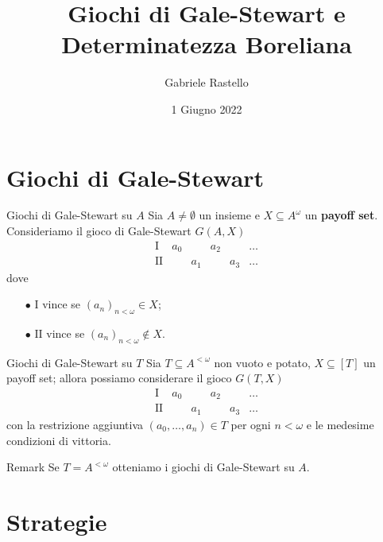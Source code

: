 \documentclass[aspectratio=43]{beamer}
\title{Giochi di Gale-Stewart e Determinatezza Boreliana}
\author{Gabriele Rastello}
\date{1 Giugno 2022}
\begin{document}
\begin{frame}
  \titlepage
\end{frame}

\section{Giochi di Gale-Stewart}

\begin{frame}{Giochi di Gale-Stewart su \(A\)}
  Sia \(A \neq \emptyset\) un insieme e \(X \subseteq A^\omega\) un \textbf{payoff set}.
  Consideriamo il gioco di Gale-Stewart \(G(A, X)\)
  \begin{equation*}
    \begin{matrix}
      \mathrm{I} & a_0 & & a_2 & & \ldots\\
      \mathrm{II} & & a_1 & & a_3 & \ldots
    \end{matrix}
  \end{equation*}
  \pause
  dove
  \begin{itemize}
  \item[\(\bullet\)] \(\mathrm{I}\) vince se \((a_n)_{n < \omega} \in X\);
  \item[\(\bullet\)] \(\mathrm{II}\) vince se \((a_n)_{n < \omega} \not\in X\).
  \end{itemize}
\end{frame}

\begin{frame}{Giochi di Gale-Stewart su \(T\)}
  Sia \(T \subseteq A^{<\omega}\) non vuoto e potato, \(X\subseteq [T]\) un payoff set; allora possiamo considerare il gioco \(G(T, X)\)
  \begin{equation*}
    \begin{matrix}
      \mathrm{I} & a_0 & & a_2 & & \ldots\\
      \mathrm{II} & & a_1 & & a_3 & \ldots
    \end{matrix}
  \end{equation*}
  con la restrizione aggiuntiva \((a_0, \ldots, a_n) \in T\) per ogni \(n < \omega\) e le medesime condizioni di vittoria.
  \pause
  \begin{block}{Remark}
    Se \(T = A^{<\omega}\) otteniamo i giochi di Gale-Stewart su \(A\).
  \end{block}
\end{frame}

\section{Strategie}
\end{document}
